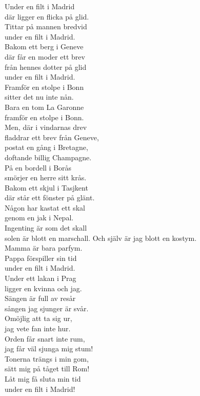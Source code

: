 \documentclass[a6paper, 10pt, twoside]{article}
\begin{document}
\begin{center}
\end{center}
\begin{lyrics}
\small Under en filt i Madrid\\ 
där ligger en flicka på glid.\\ 
Tittar på mannen bredvid\\ 
under en filt i Madrid.
\vspace{5pt}\\ 
Bakom ett berg i Geneve\\ 
där får en moder ett brev\\
från hennes dotter på glid\\ 
under en filt i Madrid.
\vspace{5pt}\\  
Framför en stolpe i Bonn\\ 
sitter det nu inte nån.\\ 
Bara en tom La Garonne\\ 
framför en stolpe i Bonn.
\vspace{5pt}\\  
Men, där i vindarnas drev\\ 
fladdrar ett brev från Geneve,\\ 
postat en gång i Bretagne,\\ 
doftande billig Champagne.
\vspace{5pt}\\  
På en bordell i Borås\\ 
smörjer en herre sitt krås.\\ 
Bakom ett skjul i Tasjkent\\ 
där står ett fönster på glänt.
\vspace{5pt}\\  
Någon har kastat ett skal\\ 
genom en jak i Nepal.\\ 
Ingenting är som det skall\\ 
solen är blott en marschall. 
\newpage
Och själv är jag blott en kostym.\\ 
Mamma är bara parfym.\\ 
Pappa förspiller sin tid\\ 
under en filt i Madrid.
\vspace{5pt}\\  
Under ett lakan i Prag\\ 
ligger en kvinna och jag.\\ 
Sängen är full av resår\\ 
sången jag sjunger är svår.
\vspace{5pt}\\  
Omöjlig att ta sig ur,\\ 
jag vete fan inte hur.\\ 
Orden får snart inte rum,\\ 
jag får väl sjunga mig stum!
\vspace{5pt}\\  
Tonerna trängs i min gom,\\ 
sätt mig på tåget till Rom!\\ 
Låt mig få sluta min tid\\ 
under en filt i Madrid! 
\end{lyrics}
\end{document}
